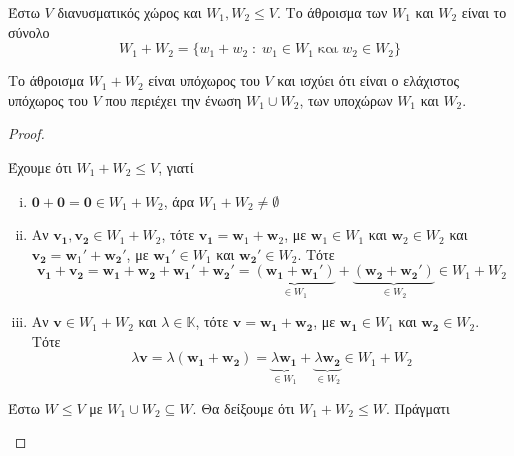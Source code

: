 \begin{dfn}
    Έστω $V$ διανυσματικός χώρος και $ W_{1}, W_{2} \leq V $. Το άθροισμα των 
    $ W_{1} $ και $ W_{2} $ είναι το σύνολο 
    \[
        W_{1}+W_{2} = \{ w_{1}+w_{2} \; : \; w_{1} \in W_{1} \; \text{και} \; w_{2} \in
        W_{2} \} 
    \]
\end{dfn}

\begin{prop}
    Το άθροισμα $ W_{1}+W_{2} $ είναι υπόχωρος του $V$ και ισχύει ότι είναι ο 
    ελάχιστος υπόχωρος του $V$ που περιέχει την ένωση $ W_{1} \cup W_{2} $, των 
    υποχώρων $ W_{1} $ και $ W_{2} $. 
\end{prop}

\begin{proof}
\item {}
    \begin{myitemize}
    \item 
        Έχουμε ότι $ W_{1}+W_{2} \leq V $, γιατί
        \begin{enumerate}[i)]
            \item $ \mathbf{0}+ \mathbf{0} = \mathbf{0} \in W_{1}+W_{2} $, άρα 
                $ W_{1}+W_{2} \neq \emptyset $
            \item Αν $ \mathbf{v_{1}}, \mathbf{v_{2}} \in W_{1}+W_{2} $, τότε 
                $ \mathbf{v_{1}} = \mathbf{w}_{1}+ \mathbf{w}_{2} $, με 
                $ \mathbf{w}_{1} \in W_{1} $ και $ \mathbf{w}_{2} \in W_{2} $ και 
                $ \mathbf{v_{2}} = \mathbf{w}_{1}' + \mathbf{w_{2}}' $, με 
                $ \mathbf{w_{1}}' \in W_{1} $ και $ \mathbf{w_{2}}' \in W_{2} $. Τότε
                \[
                    \mathbf{v_{1}}+ \mathbf{v_{2}} = \mathbf{w_{1}}+ \mathbf{w_{2}} + 
                    \mathbf{w_{1}}' + \mathbf{w_{2}}' = \underbrace{(\mathbf{w_{1}}+
                        \mathbf{w_{1}}')}_{\in W_{1}} + \underbrace{(\mathbf{w_{2}}+ 
                    \mathbf{w_{2}}')}_{\in W_{2}} \in W_{1}+W_{2}
                \] 
            \item Αν $ \mathbf{v} \in W_{1}+W_{2} $ και $ \lambda \in \mathbb{K} $, 
                τότε $ \mathbf{v} = \mathbf{w_{1}}+ \mathbf{w_{2}} $, με 
                $ \mathbf{w_{1}} \in W_{1} $ και $ \mathbf{w_{2}} \in W_{2} $.  Τότε
                \[
                    \lambda \mathbf{v} = \lambda (\mathbf{w_{1}}+ \mathbf{w_{2}}) = 
                    \underbrace{\lambda \mathbf{w_{1}}}_{\in W_{1}} + 
                    \underbrace{\lambda \mathbf{w_{2}}}_{\in W_{2}} \in W_{1}+W_{2}
                \] 
        \end{enumerate}
    \item 
        Έστω $ W \leq V $ με $ W_{1} \cup W_{2} \subseteq W $. Θα δείξουμε ότι 
        $ W_{1}+W_{2} \leq W $.  Πράγματι


\end{myitemize}
\end{proof}
